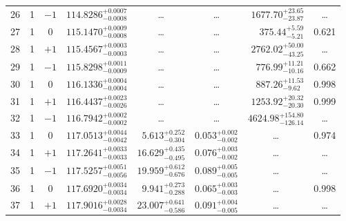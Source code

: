 \begin{table*}[!]
\begin{tabular}{llcrrlrc}
26 & 1 & $-1$ & $    114.8286_{-      0.0008}^{+      0.0007}$ & \multicolumn{1}{c}{\dots} & \multicolumn{1}{c}{\dots} & $     1677.70_{-       23.87}^{+       23.65}$ & \dots\\[1pt]
27 & 1 & 0 & $    115.1470_{-      0.0008}^{+      0.0009}$ & \multicolumn{1}{c}{\dots} & \multicolumn{1}{c}{\dots} & $      375.44_{-        5.21}^{+        5.59}$ & 0.621\\[1pt]
28 & 1 & $+1$ & $    115.4567_{-      0.0003}^{+      0.0003}$ & \multicolumn{1}{c}{\dots} & \multicolumn{1}{c}{\dots} & $     2762.02_{-       43.25}^{+       50.00}$ & \dots\\[1pt]
29 & 1 & $-1$ & $    115.8298_{-      0.0009}^{+      0.0011}$ & \multicolumn{1}{c}{\dots} & \multicolumn{1}{c}{\dots} & $      776.99_{-       10.16}^{+       11.21}$ & 0.662\\[1pt]
30 & 1 & 0 & $    116.1336_{-      0.0004}^{+      0.0004}$ & \multicolumn{1}{c}{\dots} & \multicolumn{1}{c}{\dots} & $      887.26_{-        9.62}^{+       11.53}$ & 0.998\\[1pt]
31 & 1 & $+1$ & $    116.4437_{-      0.0026}^{+      0.0023}$ & \multicolumn{1}{c}{\dots} & \multicolumn{1}{c}{\dots} & $     1253.92_{-       20.30}^{+       20.32}$ & 0.999\\[1pt]
32 & 1 & $-1$ & $    116.7942_{-      0.0002}^{+      0.0002}$ & \multicolumn{1}{c}{\dots} & \multicolumn{1}{c}{\dots} & $     4624.98_{-      126.14}^{+      154.80}$ & \dots\\[1pt]
33 & 1 & 0 & $    117.0513_{-      0.0042}^{+      0.0044}$ & $       5.613_{-       0.304}^{+       0.252}$ & $       0.053_{-       0.002}^{+       0.002}$ & \multicolumn{1}{c}{\dots} & 0.974\\[1pt]
34 & 1 & $+1$ & $    117.2641_{-      0.0033}^{+      0.0033}$ & $      16.629_{-       0.495}^{+       0.435}$ & $       0.076_{-       0.002}^{+       0.003}$ & \multicolumn{1}{c}{\dots} & \dots\\[1pt]
35 & 1 & $-1$ & $    117.5257_{-      0.0056}^{+      0.0051}$ & $      19.959_{-       0.676}^{+       0.612}$ & $       0.089_{-       0.005}^{+       0.005}$ & \multicolumn{1}{c}{\dots} & \dots\\[1pt]
36 & 1 & 0 & $    117.6920_{-      0.0034}^{+      0.0034}$ & $       9.941_{-       0.288}^{+       0.273}$ & $       0.065_{-       0.003}^{+       0.003}$ & \multicolumn{1}{c}{\dots} & 0.998\\[1pt]
37 & 1 & $+1$ & $    117.9016_{-      0.0034}^{+      0.0028}$ & $      23.007_{-       0.586}^{+       0.641}$ & $       0.091_{-       0.005}^{+       0.004}$ & \multicolumn{1}{c}{\dots} & \dots\\[1pt]

\end{tabular}
\end{table*}
